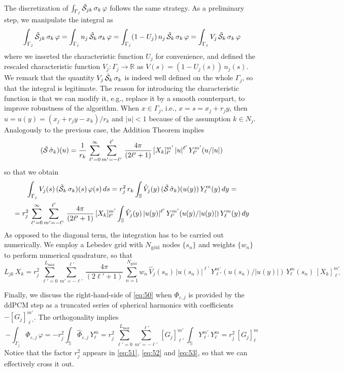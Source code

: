 The discretization of $\int_{\Gamma_j} \tilde{\mathcal{S}}_{jk} \, \sigma_k \, \varphi $ follows the same strategy. As a preliminary step, we manipulate the integral as
\[
\int_{\Gamma_j} \tilde{\mathcal{S}}_{jk} \, \sigma_k \, \varphi =\int_{\Gamma_j} n_j \, \tilde{\mathcal{S}}_{k} \, \sigma_k \, \varphi = \int_{\Gamma_j} (1 - U_j ) \,n_j \, \tilde{\mathcal{S}}_{k} \, \sigma_k \, \varphi = \int_{\Gamma_j} V_j \, \tilde{\mathcal{S}}_{k} \, \sigma_k \, \varphi
\]
where we inserted the characteristic function $U_j$ for convenience, and defined the rescaled characteristic function $V_j : \Gamma_j \to \mathbb{R}$ as $V(s) = (1 - U_j(s)) \, n_j(s)$. We remark that the quantity $V_j \, \tilde{\mathcal{S}}_{k} \, \sigma_k $ is indeed well defined on the whole $\Gamma_j$, so that the integral is legitimate. The reason for introducing the characteristic function is that we can modify it, e.g., replace it by a smooth counterpart, to improve robustness of the algorithm. When $x \in \Gamma_j$, i.e., $x = s = x_j + r_j y$, then $u = u(y) = (x_j + r_j y -x_k)/r_k$ and $|u| < 1$ because of the assumption $k \in N_j$. Analogously to the previous case, the Addition Theorem implies
\[
(\tilde{\mathcal{S}} \, \hat{\sigma}_k)(u) = \frac{1}{r_k} \, \sum_{\ell'= 0}^{\infty} \sum_{m' = -\ell'}^{\ell'} \, \frac{4\pi}{(2\ell' + 1)}\, [X_k]_{\ell'}^{m'} \, |u|^{\ell'} \, Y_{\ell'}^{m'}(u/|u|)
\]
so that we obtain
\begin{multline*}
\int_{\Gamma_j} V_j(s) \, (\tilde{\mathcal{S}}_{k} \, \sigma_k)(s) \, \varphi(s) \, ds =  r_j^2 \,r_k \int_\mathbb{S} \hat{V}_j(y) \, (\tilde{\mathcal{S}} \, \hat{\sigma}_k)(u(y)) \, Y_\ell^m(y) \, dy = \\
= r_j^2 \, \sum_{\ell'= 0}^{\infty} \sum_{m' = -\ell'}^{\ell'} \, \frac{4\pi}{(2\ell' + 1)}\, [X_k]_{\ell'}^{m'} \int_\mathbb{S} \hat{V}_j(y) \, |u(y)|^{\ell'} \, Y_{\ell'}^{m'}(u(y)/|u(y)|) \, Y_\ell^m(y) \, dy
\end{multline*}
As opposed to the diagonal term, the integration has to be carried out numerically. We employ a Lebedev grid with $N_\text{grid}$ nodes $\{s_n\}$ and weights $\{ w_n \}$ to perform numerical quadrature, so that
\begin{equation}\label{eq:52}
L_{jk} \, X_k = r_j^2 \, \sum_{\ell'= 0}^{L_\text{max}}  \sum_{m' = -\ell'}^{\ell'} \, \frac{4\pi}{(2\ell' + 1)}\, \sum_{n = 1}^{N_\text{grid}} w_n \, \hat{V}_j(s_n) \, |u(s_n)|^{\ell'} \, Y_{\ell'}^{m'}(u(s_n)/|u(y)|) \, Y_\ell^m(s_n)\, [X_k]_{\ell'}^{m'}  
\end{equation}

Finally, we discuss the right-hand-side of \eqref{eq:50} when $\Phi_{\varepsilon,j}$ is provided by the ddPCM step as a truncated series of spherical harmonics with coefficients $-[G_j]_{\ell'}^{m'}$. The orthogonality implies
\begin{equation}\label{eq:53}
-\int_{\Gamma_j} \Phi_{\varepsilon,j} \, \varphi =  - r_j^2 \int_\mathbb{S} \hat{\Phi}_{\varepsilon,j} \, Y_\ell^m = r_j^2 \,  \sum_{\ell'= 0}^{L_\text{max}} \sum_{m' = -\ell'}^{\ell'} \, [G_j]_{\ell'}^{m'} \,  \int_{\mathbb{S}}  Y_{\ell'}^{m'} \, Y_\ell^m = r_j^2 \, [G_j]_\ell^m
\end{equation}
Notice that the factor $r_j^2$ appears in \eqref{eq:51}, \eqref{eq:52} and \eqref{eq:53}, so that we can effectively cross it out.